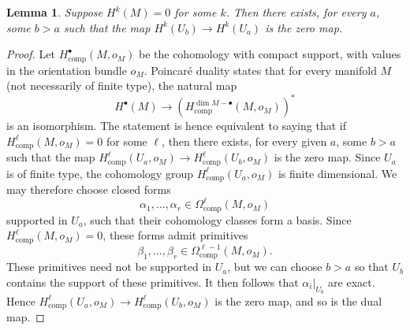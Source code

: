 \documentclass[11pt]{amsart}
\newtheorem{lemma}[theorem]{Lemma}
\theoremstyle{definition}
\theoremstyle{remark}
\newcommand{\on}{\operatorname}
\begin{document}
\begin{lemma}
	Suppose $H^k(M)=0$ for some $k$. Then there exists, for every $a$, some $b>a$ such that 
	the map  $H^k(U_{b})\to H^k(U_{a})$ is the zero map.
\end{lemma}
\begin{proof}
	Let $H^\bullet_{\on{comp}}(M,o_M)$ be the cohomology with compact support, with values in the orientation bundle
	$o_M$.
	Poincar\'{e} duality \cite[page 194]{gr:co1}
	states that for every manifold $M$ (not necessarily of finite type), the natural map 
	\[ H^\bullet(M)\to 	(H_{\on{comp}}^{\dim M-\bullet}(M,o_M))^*\]
	is an isomorphism. The statement is hence equivalent to saying that 
	if	$H^{\ell}_{\on{comp}}(M,o_M)=0$ for some $\ell$, then there exists, for every given $a$, some $b>a$ such that 
	the map  $H^\ell_{\on{comp}}(U_{a},o_M)\to H^\ell_{\on{comp}}(U_{b},o_M)$ is the zero map. Since 
	$U_a$ is of finite type, the cohomology group $H^\ell_{\on{comp}}(U_{a},o_M)$ is finite dimensional. We may therefore choose closed forms 
	\[ \alpha_1,\ldots,\alpha_r\in  \Omega^\ell_{\on{comp}}(M,o_M)
	\] 
	supported in $U_a$, such that their cohomology classes form a basis. Since $H^{\ell}_{\on{comp}}(M,o_M)=0$, 
	these forms admit primitives
	\[\beta_1,\ldots,\beta_r
	\in  \Omega^{\ell-1}_{\on{comp}}(M,o_M).\] 
	These primitives need not be supported in $U_a$, but we can choose  $b>a$ so that 
	$U_b$ contains the support of these primitives. It then follows that $\alpha_i|_{U_b}$ are exact.  
	Hence 
	$H^{\ell}_{\on{comp}}(U_a,o_M)\to  H^{\ell}_{\on{comp}}(U_b,o_M)$ is the zero map, and so is the dual map. 
\end{proof}
\end{document}
